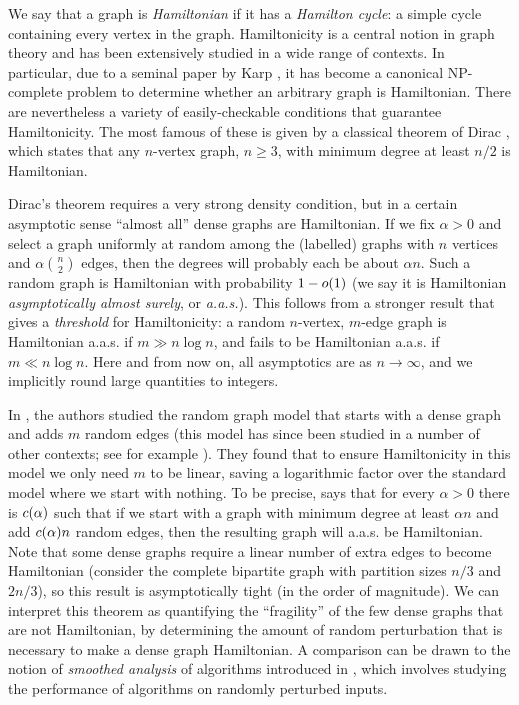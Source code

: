 \documentclass[11pt,english]{article}
\theoremstyle{plain}
\theoremstyle{definition}
\theoremstyle{definition}
\theoremstyle{plain}
\theoremstyle{plain}
\theoremstyle{plain}
\theoremstyle{plain}
\theoremstyle{remark}
\theoremstyle{remark}
\let\originalleft\left
\let\originalright\right
\renewcommand{\left}{\mathopen{}\mathclose\bgroup\originalleft}
\renewcommand{\right}{\aftergroup\egroup\originalright}
\begin{document}
We say that a graph is \emph{Hamiltonian} if it has a \emph{Hamilton
cycle}: a simple cycle containing every vertex in the graph. Hamiltonicity
is a central notion in graph theory and has been extensively studied
in a wide range of contexts. In particular, due to a seminal paper
by Karp \cite{Kar72}, it has become a canonical NP-complete problem
to determine whether an arbitrary graph is Hamiltonian. There are
nevertheless a variety of easily-checkable conditions that guarantee
Hamiltonicity. The most famous of these is given by a classical theorem
of Dirac \cite{Dir52}, which states that any $n$-vertex graph, $n\ge 3$, with
minimum degree at least $n/2$ is Hamiltonian.

Dirac's theorem requires a very strong density condition, but in a
certain asymptotic sense ``almost all'' dense graphs are Hamiltonian.
If we fix $\alpha>0$ and select a graph uniformly at random among
the (labelled) graphs with $n$ vertices and $\alpha{n \choose 2}$
edges, then the degrees will probably each be about $\alpha n$. Such
a random graph is Hamiltonian with probability $1-o\left(1\right)$
(we say it is Hamiltonian \emph{asymptotically almost surely}, or
\emph{a.a.s.}). This follows from a stronger result \cite{Pos76}
that gives a \emph{threshold} for Hamiltonicity: a random $n$-vertex,
$m$-edge graph is Hamiltonian a.a.s. if $m\gg n\log n$, and fails
to be Hamiltonian a.a.s. if $m\ll n\log n$. Here and from now on,
all asymptotics are as $n\to\infty$, and we implicitly round large
quantities to integers.

In \cite{BFM03}, the authors studied the random graph model that
starts with a dense graph and adds $m$ random edges (this model has
since been studied in a number of other contexts; see for example
\cite{BHM04,KST06}). They found that to ensure Hamiltonicity in this
model we only need $m$ to be linear, saving a logarithmic factor
over the standard model where we start with nothing. To be precise,
\cite[Theorem~1]{BFM03} says that for every $\alpha>0$ there is
$\cdi\left(\alpha\right)$ such that if we start with a graph with
minimum degree at least $\alpha n$ and add $\cdi\left(\alpha\right)n$
random edges, then the resulting graph will a.a.s. be Hamiltonian.
Note that some dense graphs require a linear number of extra edges
to become Hamiltonian (consider the complete bipartite graph with
partition sizes $n/3$ and $2n/3$), so this result is asymptotically
tight (in the order of magnitude). We can interpret this theorem as quantifying the ``fragility''
of the few dense graphs that are not Hamiltonian, by determining the
amount of random perturbation that is necessary to make a dense graph
Hamiltonian. A comparison can be drawn to the notion of \emph{smoothed
analysis} of algorithms introduced in \cite{ST04}, which involves
studying the performance of algorithms on randomly perturbed inputs.
\end{document}
